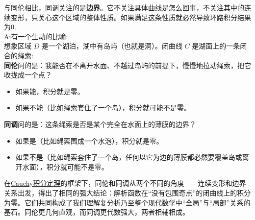 \documentclass[UTF8]{ctexart}
\newcommand{\CauchyThm}{\hyperref[thm:Cauchy]{Cauchy积分定理}}
\begin{document}
与同伦相比，同调关注的是\textbf{边界}。它不关注具体曲线是怎么回事，不关注其中的连续变形，只关心这个区域的整体性质。如果满足这条性质就必然导致环路积分结果为0.\\
Ai有一个生动的比喻:\\
想象区域 $D$ 是一个湖泊，湖中有岛屿（也就是洞）。闭曲线 $C$ 是湖面上的一条闭合的绳索:\\
\textbf{同伦}问的是：我能否在不离开水面、不越过岛屿的前提下，慢慢地拉动绳索，把它收拢成一个点？
\begin{itemize}
    \item 如果能，积分就是零。
    \item 如果不能（比如绳索套住了一个岛），积分就可能不是零。
\end{itemize}
\textbf{同调}问的是：这条绳索是否是某个完全在水面上的薄膜的边界？
\begin{itemize}
    \item 如果是（比如绳索围成一个水泡），积分就是零。
    \item 如果不是（比如绳索套住了一个岛，任何以它为边的薄膜都必然要覆盖岛或离开水面），积分就可能不是零。
\end{itemize}
在\CauchyThm 的框架下，同伦和同调从两个不同的角度——连续变形和边界关系出发，得出了相同的强大结论：解析函数在“没有包围奇点”的闭曲线上的积分为零。它们共同构成了我们理解复分析乃至整个现代数学中“全局”与“局部”关系的基石。同伦更几何直观，而同调更代数强大，两者相辅相成。
\end{document}
